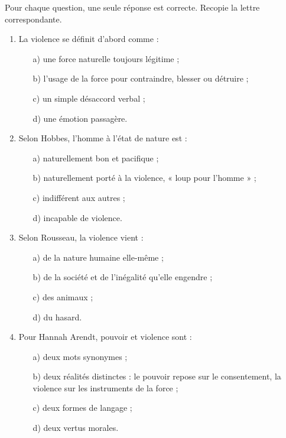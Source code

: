 \documentclass[11pt]{article}
\begin{document}
\begin{exercice}
Pour chaque question, une seule réponse est correcte. Recopie la lettre correspondante.
\begin{enumerate}
\item La violence se définit d'abord comme :
\begin{enumerate}
\item[a)] une force naturelle toujours légitime ;
\item[b)] l'usage de la force pour contraindre, blesser ou détruire ;
\item[c)] un simple désaccord verbal ;
\item[d)] une émotion passagère.
\end{enumerate}
\item Selon Hobbes, l'homme à l'état de nature est :
\begin{enumerate}
\item[a)] naturellement bon et pacifique ;
\item[b)] naturellement porté à la violence, « loup pour l'homme » ;
\item[c)] indifférent aux autres ;
\item[d)] incapable de violence.
\end{enumerate}
\item Selon Rousseau, la violence vient :
\begin{enumerate}
\item[a)] de la nature humaine elle-même ;
\item[b)] de la société et de l'inégalité qu'elle engendre ;
\item[c)] des animaux ;
\item[d)] du hasard.
\end{enumerate}
\item Pour Hannah Arendt, pouvoir et violence sont :
\begin{enumerate}
\item[a)] deux mots synonymes ;
\item[b)] deux réalités distinctes : le pouvoir repose sur le consentement, la violence sur les instruments de la force ;
\item[c)] deux formes de langage ;
\item[d)] deux vertus morales.
\end{enumerate}
\end{enumerate}
\end{exercice}
\end{document}
